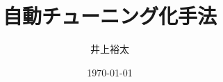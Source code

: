 \documentclass[a4j,12pt,onecolumn]{ujarticle} %
\title{ 自動チューニング化手法 }
\author{井上裕太}
\date{\today}
\begin{document}
\maketitle %


\clearpage
\tableofcontents
\clearpage
\listoffigures
\clearpage
\listoftables

% 
\clearpage

\clearpage

\clearpage

\clearpage

\clearpage

\clearpage

\clearpage
\medskip


\end{document}
